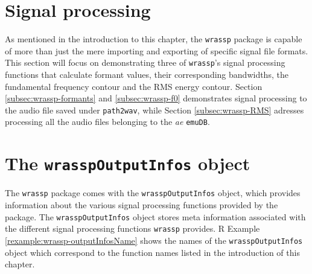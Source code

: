 \documentclass[]{book}
\newenvironment{Shaded}{\begin{snugshade}}{\end{snugshade}}
\newcommand{\CommentTok}[1]{\textcolor[rgb]{0.56,0.35,0.01}{\textit{#1}}}
\newcommand{\FloatTok}[1]{\textcolor[rgb]{0.00,0.00,0.81}{#1}}
\newcommand{\KeywordTok}[1]{\textcolor[rgb]{0.13,0.29,0.53}{\textbf{#1}}}
\newcommand{\NormalTok}[1]{#1}
\newcommand{\OperatorTok}[1]{\textcolor[rgb]{0.81,0.36,0.00}{\textbf{#1}}}
\newcommand{\StringTok}[1]{\textcolor[rgb]{0.31,0.60,0.02}{#1}}
\theoremstyle{definition}
\theoremstyle{definition}
\theoremstyle{definition}
\theoremstyle{remark}
\begin{document}
\begin{Shaded}
\end{Shaded}

\hypertarget{signal-processing}{%
\section{Signal processing}\label{signal-processing}}

As mentioned in the introduction to this chapter, the \texttt{wrassp}
package is capable of more than just the mere importing and exporting of
specific signal file formats. This section will focus on demonstrating
three of \texttt{wrassp}'s signal processing functions that calculate
formant values, their corresponding bandwidths, the fundamental
frequency contour and the RMS energy contour. Section
\ref{subsec:wrassp-formants} and \ref{subsec:wrassp-f0} demonstrates
signal processing to the audio file saved under \texttt{path2wav}, while
Section \ref{subsec:wrassp-RMS} adresses processing all the audio files
belonging to the \emph{ae} \texttt{emuDB}.

\hypertarget{subsec:wrassp-wrasspOutputInfos}{%
\section{\texorpdfstring{The \texttt{wrasspOutputInfos}
object}{The wrasspOutputInfos object}}\label{subsec:wrassp-wrasspOutputInfos}}

The \texttt{wrassp} package comes with the \texttt{wrasspOutputInfos}
object, which provides information about the various signal processing
functions provided by the package. The \texttt{wrasspOutputInfos} object
stores meta information associated with the different signal processing
functions \texttt{wrassp} provides. R Example
\ref{rexample:wrassp-outputInfosName} shows the names of the
\texttt{wrasspOutputInfos} object which correspond to the function names
listed in the introduction of this chapter.
\end{document}
